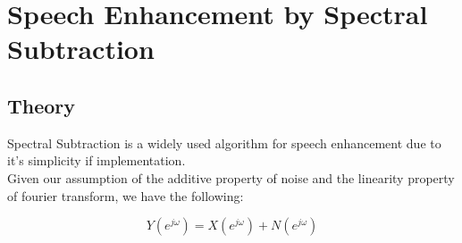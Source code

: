 \chapter{Speech Enhancement by Spectral Subtraction}

\section{Theory}
Spectral Subtraction is a widely used algorithm for speech enhancement due to it's simplicity if implementation.\\ 

Given our assumption of the additive property of noise and the linearity property of fourier transform, we have the following: 

$$ Y(e^{j\omega}) = X(e^{j\omega}) + N(e^{j\omega}) $$

